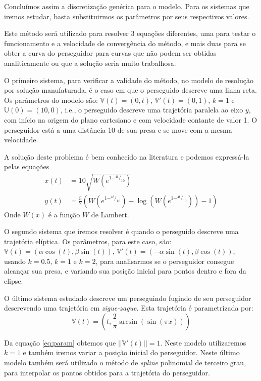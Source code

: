 \documentclass[a4paper,10pt]{article}
\begin{document}
  Concluímos assim a discretização genérica para o modelo. Para os sistemas que iremos estudar, basta substituirmos os parâmetros por seus respectivos valores.
  
  Este método será utilizado para resolver 3 equações diferentes, uma para testar o funcionamento e a velocidade de convergência do método, e mais duas para se obter a curva do perseguidor para curvas que não podem ser obtidas analiticamente ou que a solução seria muito trabalhosa. 
  
  O primeiro sistema, para verificar a validade do método, no modelo de resolução por solução manufaturada, é o caso em que o perseguido descreve uma linha reta. Os parâmetros do modelo são: $\mathbb{V}(t) = (0, t)$, $\mathbb{V}'(t) = (0, 1)$, $k = 1$ e $\mathbb{U}(0) = (10, 0)$, i.e., o perseguido descreve uma trajetória paralela ao eixo $y$, com início na origem do plano cartesiano e com velocidade contante de valor 1. O perseguidor está a uma distância 10 de sua presa e se move com a mesma velocidade.
  
  A solução deste problema é bem conhecido na literatura\cite{wolfram} e podemos expressá-la pelas equações
  \begin{align}
   x(t) &= 10\sqrt{W(e^{1 -^{4t}/_{10}})} \\
   y(t) &= \frac{5}{2}(W(e^{1 -^{4t}/_{10}}) - \log{(W(e^{1 -^{4t}/_{10}}))} - 1)   
  \end{align}
  Onde $W(x)$ é a função $W$ de Lambert.
  
  O segundo sistema que iremos resolver é quando o perseguido descreve uma trajetória elíptica. Os parâmetros, para este caso, são: $\mathbb{V}(t) = (\alpha \cos(t), \beta \sin(t))$, $\mathbb{V}'(t) = (-\alpha \sin(t), \beta \cos(t))$, usando $k = 0.5$, $k = 1$ e $k = 2$, para analisarmos se o perseguidor consegue alcançar sua presa, e variando sua posição inicial para pontos dentro e fora da elipse.
  
  O último sistema estudado descreve um perseguindo fugindo de seu perseguidor descrevendo uma trajetória em \emph{zigue-zague}. Esta trajetória é parametrizada por:
  \begin{equation}
   \mathbb{V}(t) =
   (t, \frac{2}{\pi} \arcsin(\sin(\pi x)))
   \label{eq:param}
  \end{equation}
  
  Da equação \ref{eq:param} obtemos que $||\mathbb{V}'(t)|| = 1$. Neste modelo utilizaremos $k = 1$ e também iremos variar a posição inicial do perseguidor. Neste último modelo também será utilizado o método de \emph{spline} polinomial de terceiro grau, para interpolar os pontos obtidos para a trajetória do perseguidor.  
   
\end{document}
